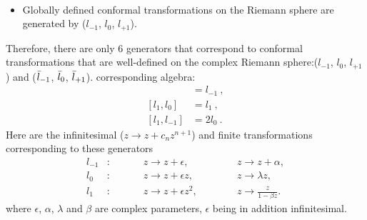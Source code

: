 \documentclass[]{article}
\numberwithin{equation}{section}
\begin{document}
{{\begin{align}
\end{align}
\begin{itemize}
    \item Globally defined conformal transformations on the Riemann sphere are generated by ({$l_{-1}$, $l_{0}$, $l_{+1}$}).
\end{itemize}
Therefore, there are only
6 generators that correspond to conformal transformations that are well-defined on the complex
Riemann sphere:({$l_{-1}$, $l_{0}$, $l_{+1}$}) and ({$\Bar{l}_{-1}$, $\Bar{l}_{0}$, $\Bar{l}_{+1}$}).
 corresponding algebra:
 \begin{align*}
     [l_0,l_{-1}]&=l_{-1}~,\\
     [l_1,l_{0}]&=l_{1}~,\\
     [l_1,l_{-1}]&=2l_{0}~.
 \end{align*}
 Here are the infinitesimal ($z\rightarrow z+c_nz^{n+1}$) and finite transformations corresponding to these generators
 \begin{align*}
     l_{-1}&:~~~~~~~~&&z\rightarrow z+\epsilon,~~~~~~~&&&z\rightarrow z+\alpha,\\
     l_{0}&:~~~~~~~~&&z\rightarrow z+\epsilon z,~~~~~~~&&&z\rightarrow \lambda z,\\
     l_{1}&:~~~~~~~~&&z\rightarrow z+\epsilon z^2,~~~~~~~&&&z\rightarrow \frac{z}{1-\beta z}.
 \end{align*}
where $\epsilon$, $\alpha$, $\lambda$ and $\beta$ are complex parameters, $\epsilon$ being in addition infinitesimal.

}}
\end{document}

